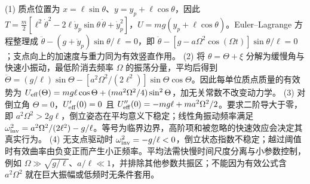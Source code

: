 (1) 质点位置为 \(x=\ell\sin\theta\)、\(y=y_p+\ell\cos\theta\)，因此 \(T=\tfrac m2[\ell^2\dot\theta^2-2\ell\dot y_p\sin\theta\,\dot\theta+\dot y_p^2]\)，\(U=mg(y_p+\ell\cos\theta)\)。Euler–Lagrange 方程整理成 \(\ddot\theta-(g+\ddot y_p)\sin\theta/\ell=0\)，即 \(\ddot\theta-[g-a\Omega^2\cos(\Omega t)]\sin\theta/\ell=0\)；支点向上的加速度与重力同为有效竖直作用。
(2) 将 \(\theta=\Theta+\xi\) 分解为缓慢角与快速小振动，最低阶消去频率 \(\Omega\) 的振荡分量，平均后得到 \(\ddot\Theta=(g/\ell)\sin\Theta-[a^2\Omega^2/(2\ell^2)]\sin\Theta\cos\Theta\)。因此每单位质点质量的有效势为 \(U_{\rm eff}(\Theta)=mg\ell\cos\Theta+(ma^2\Omega^2/4)\sin^2\Theta\)，加无关常数不改变动力学。
(3) 对倒立角 \(\Theta=0\)，\(U_{\rm eff}'(0)=0\) 且 \(U_{\rm eff}''(0)=-mg\ell+ma^2\Omega^2/2\)。要求二阶导大于零，即 \(a^2\Omega^2>2g\ell\)，倒立姿态在平均意义下稳定；线性角振动频率满足 \(\omega_{\rm inv}^2=a^2\Omega^2/(2\ell^2)-g/\ell\)。等号为临界边界，高阶项和被忽略的快速效应会决定其真实行为。
(4) 无支点驱动时 \(\omega_{\rm inv}^2=-g/\ell<0\)，倒立状态指数不稳定；越过阈值时有效曲率由负变正而产生小正频率。平均法需快慢时间尺度分离与小参数控制，例如 \(\Omega\gg\sqrt{g/\ell}\)、\(a/\ell\ll1\)，并排除其他参数共振区；不能因为有效公式含 \(a^2\Omega^2\) 就在巨大振幅或低频时无条件套用。
